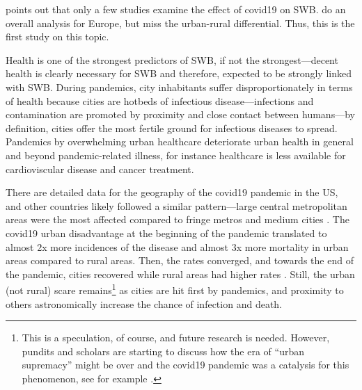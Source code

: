 \documentclass[10pt, letterpaper]{article}
\begin{document}
\begin{spacing}{1.4}
\citet{easterlin23} points out that only a few studies examine the effect of covid19 on SWB.  \citet{easterlin23} do an overall analysis for Europe, but miss the urban-rural differential. Thus, this is the first study on this topic.

Health is one of the strongest predictors of SWB, if not the strongest---decent health is clearly necessary for SWB \citep[e.g.,][]{campbell76etal} and therefore, expected to be
strongly linked with SWB. During pandemics, city inhabitants suffer disproportionately in terms of health because cities are hotbeds of infectious disease---infections and contamination are promoted by proximity and close contact between humans---by definition, cities offer the
most fertile ground for infectious diseases to spread. Pandemics by overwhelming
urban healthcare deteriorate urban health in general and beyond pandemic-related
illness, for instance healthcare is less available for cardioviscular disease
and cancer treatment. 

There are detailed data for the geography of the covid19 pandemic in the US, and other
countries likely followed a similar pattern---large central metropolitan areas were the most affected compared to fringe metros and medium cities \citep{curtin2022covid}.
 The covid19 urban disadvantage at the beginning of the pandemic translated to almost 2x more incidences of the disease and almost 3x more mortality in urban areas compared to rural areas. Then, the rates converged, and towards the end of the pandemic, cities recovered while rural areas had higher rates \citep{cuadros2021dynamics}. 
 Still, the urban (not rural) scare remains\footnote{This is a speculation, of course, and future research is needed. However, pundits and scholars are starting to discuss how the era of ``urban supremacy'' might be over and the covid19 pandemic was a catalysis for this phenomenon, see for example \citet{edsall2023}.} as cities are hit first by pandemics, and proximity to others astronomically increase the chance of infection and death.   
%
 

\end{spacing}
\end{document}
